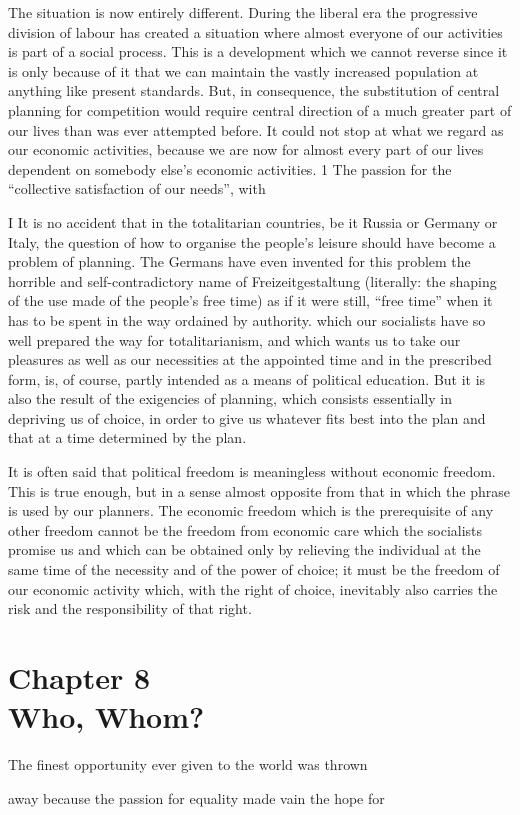 \documentclass[11pt,openany]{book}
\newcommand{\bookchapter}[2]{%
  \clearpage\phantomsection
  \chapter*{{\normalfont\sffamily\small\mdseries #1}\\[6pt]#2}%
  \addcontentsline{toc}{chapter}{#1\quad #2}%
  \markboth{#2}{#2}\thispagestyle{plain}}
\begin{document}
The situation is now entirely different. During the liberal era the progressive division of labour has created a situation where almost everyone of our activities is part of a social process. This is a development which we cannot reverse since it is only because of it that we can maintain the vastly increased population at anything like present standards. But, in consequence, the substitution of central planning for competition would require central direction of a much greater part of our lives than was ever attempted before. It could not stop at what we regard as our economic activities, because we are now for almost every part of our lives dependent on somebody else's economic activities. 1 The passion for the ``collective satisfaction of our needs'', with

I It is no accident that in the totalitarian countries, be it Russia or Germany or Italy, the question of how to organise the people's leisure should have become a problem of planning. The Germans have even invented for this problem the horrible and self-contradictory name of Freizeitgestaltung (literally: the shaping of the use made of the people's free time) as if it were still, ``free time'' when it has to be spent in the way ordained by authority. which our socialists have so well prepared the way for totalitarianism, and which wants us to take our pleasures as well as our necessities at the appointed time and in the prescribed form, is, of course, partly intended as a means of political education. But it is also the result of the exigencies of planning, which consists essentially in depriving us of choice, in order to give us whatever fits best into the plan and that at a time determined by the plan.

It is often said that political freedom is meaningless without economic freedom. This is true enough, but in a sense almost opposite from that in which the phrase is used by our planners. The economic freedom which is the prerequisite of any other freedom cannot be the freedom from economic care which the socialists promise us and which can be obtained only by relieving the individual at the same time of the necessity and of the power of choice; it must be the freedom of our economic activity which, with the right of choice, inevitably also carries the risk and the responsibility of that right.

\bookchapter{Chapter 8}{Who, Whom?}

The finest opportunity ever given to the world was thrown

away because the passion for equality made vain the hope for
\end{document}

